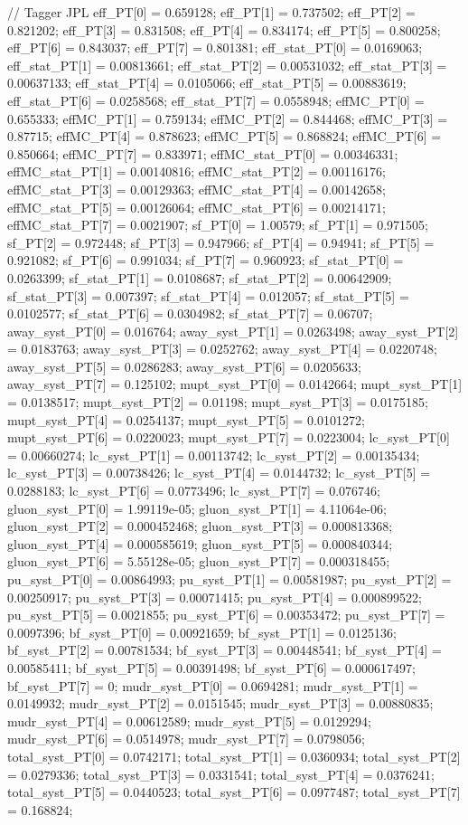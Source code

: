 // Tagger JPL
eff_PT[0] = 0.659128; eff_PT[1] = 0.737502; eff_PT[2] = 0.821202; 
eff_PT[3] = 0.831508; eff_PT[4] = 0.834174; eff_PT[5] = 0.800258; 
eff_PT[6] = 0.843037; eff_PT[7] = 0.801381; 
eff_stat_PT[0] = 0.0169063; eff_stat_PT[1] = 0.00813661; eff_stat_PT[2] = 0.00531032; 
eff_stat_PT[3] = 0.00637133; eff_stat_PT[4] = 0.0105066; eff_stat_PT[5] = 0.00883619; 
eff_stat_PT[6] = 0.0258568; eff_stat_PT[7] = 0.0558948; 
effMC_PT[0] = 0.655333; effMC_PT[1] = 0.759134; effMC_PT[2] = 0.844468; 
effMC_PT[3] = 0.87715; effMC_PT[4] = 0.878623; effMC_PT[5] = 0.868824; 
effMC_PT[6] = 0.850664; effMC_PT[7] = 0.833971; 
effMC_stat_PT[0] = 0.00346331; effMC_stat_PT[1] = 0.00140816; effMC_stat_PT[2] = 0.00116176; 
effMC_stat_PT[3] = 0.00129363; effMC_stat_PT[4] = 0.00142658; effMC_stat_PT[5] = 0.00126064; 
effMC_stat_PT[6] = 0.00214171; effMC_stat_PT[7] = 0.0021907; 
sf_PT[0] = 1.00579; sf_PT[1] = 0.971505; sf_PT[2] = 0.972448; 
sf_PT[3] = 0.947966; sf_PT[4] = 0.94941; sf_PT[5] = 0.921082; 
sf_PT[6] = 0.991034; sf_PT[7] = 0.960923; 
sf_stat_PT[0] = 0.0263399; sf_stat_PT[1] = 0.0108687; sf_stat_PT[2] = 0.00642909; 
sf_stat_PT[3] = 0.007397; sf_stat_PT[4] = 0.012057; sf_stat_PT[5] = 0.0102577; 
sf_stat_PT[6] = 0.0304982; sf_stat_PT[7] = 0.06707; 
away_syst_PT[0] = 0.016764; away_syst_PT[1] = 0.0263498; away_syst_PT[2] = 0.0183763; 
away_syst_PT[3] = 0.0252762; away_syst_PT[4] = 0.0220748; away_syst_PT[5] = 0.0286283; 
away_syst_PT[6] = 0.0205633; away_syst_PT[7] = 0.125102; 
mupt_syst_PT[0] = 0.0142664; mupt_syst_PT[1] = 0.0138517; mupt_syst_PT[2] = 0.01198; 
mupt_syst_PT[3] = 0.0175185; mupt_syst_PT[4] = 0.0254137; mupt_syst_PT[5] = 0.0101272; 
mupt_syst_PT[6] = 0.0220023; mupt_syst_PT[7] = 0.0223004; 
lc_syst_PT[0] = 0.00660274; lc_syst_PT[1] = 0.00113742; lc_syst_PT[2] = 0.00135434; 
lc_syst_PT[3] = 0.00738426; lc_syst_PT[4] = 0.0144732; lc_syst_PT[5] = 0.0288183; 
lc_syst_PT[6] = 0.0773496; lc_syst_PT[7] = 0.076746; 
gluon_syst_PT[0] = 1.99119e-05; gluon_syst_PT[1] = 4.11064e-06; gluon_syst_PT[2] = 0.000452468; 
gluon_syst_PT[3] = 0.000813368; gluon_syst_PT[4] = 0.000585619; gluon_syst_PT[5] = 0.000840344; 
gluon_syst_PT[6] = 5.55128e-05; gluon_syst_PT[7] = 0.000318455; 
pu_syst_PT[0] = 0.00864993; pu_syst_PT[1] = 0.00581987; pu_syst_PT[2] = 0.00250917; 
pu_syst_PT[3] = 0.00071415; pu_syst_PT[4] = 0.000899522; pu_syst_PT[5] = 0.0021855; 
pu_syst_PT[6] = 0.00353472; pu_syst_PT[7] = 0.0097396; 
bf_syst_PT[0] = 0.00921659; bf_syst_PT[1] = 0.0125136; bf_syst_PT[2] = 0.00781534; 
bf_syst_PT[3] = 0.00448541; bf_syst_PT[4] = 0.00585411; bf_syst_PT[5] = 0.00391498; 
bf_syst_PT[6] = 0.000617497; bf_syst_PT[7] = 0; 
mudr_syst_PT[0] = 0.0694281; mudr_syst_PT[1] = 0.0149932; mudr_syst_PT[2] = 0.0151545; 
mudr_syst_PT[3] = 0.00880835; mudr_syst_PT[4] = 0.00612589; mudr_syst_PT[5] = 0.0129294; 
mudr_syst_PT[6] = 0.0514978; mudr_syst_PT[7] = 0.0798056; 
total_syst_PT[0] = 0.0742171; total_syst_PT[1] = 0.0360934; total_syst_PT[2] = 0.0279336; 
total_syst_PT[3] = 0.0331541; total_syst_PT[4] = 0.0376241; total_syst_PT[5] = 0.0440523; 
total_syst_PT[6] = 0.0977487; total_syst_PT[7] = 0.168824; 



